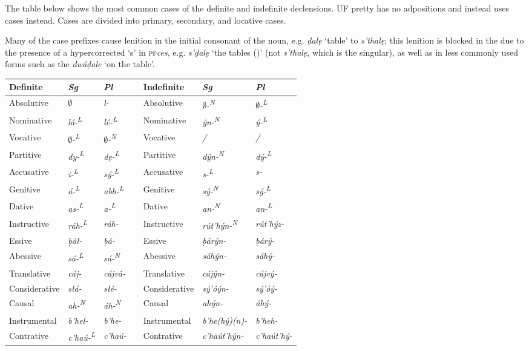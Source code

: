\documentclass[a4paper, 12pt, twoside, openright, final]{book}
\def\pfabbr{{\normalfont\scshape pf\space}}
\def\pf#1{\pfabbr\textit{#1}}
\let \nf \normalfont
\def \L {\textsuperscript{L}}
\def \N {\textsuperscript{N}}
\let \w \textit
\begin{document}
The table below shows the most common cases of the definite and indefinite declensions. UF pretty has no
adpositions and instead uses cases instead. Cases are divided into primary, secondary, and locative cases.

Many of the case prefixes cause lenition in the initial consonant of the noun, e.g. \w{ḍalẹ} ‘table’ to
 \w{s’thalẹ}; this lenition is blocked in the  due to the presence of a hypercorrected ‘s’
in \pf{ces}, e.g. \w{s’ḍalẹ} ‘the tables ()’ (not \w{s’thalẹ}, which is the singular), as well as in
less commonly used forms such as the  \w{dwáḍalẹ} ‘on the table’.

\noindent\begin{longtable}{l|>{\it}l|>{\it}lll|>{\it}l|>{\it}l}
Definite    &\nf Sg&\nf Pl && Indefinite       &\nf Sg&\nf Pl\\\cline{1-3}\cline{5-7}
\endhead
Absolutive    & $\emptyset$            & l-       && Absolutive    & $\emptyset$-\N       & $\emptyset$-\L  \\
Nominative    & lá-\L          & lé-\L    && Nominative    & ŷn-\N        & ý-\L    \\
Vocative      & $\emptyset$-\L         & $\emptyset$-\N   && Vocative      & /            & /       \\
Partitive     & dy-\L          & dẹ-\L    && Partitive     & dŷn-\N       & dý-\L   \\
Accusative    & i-\L           & sý-\L    && Accusative    & s-\L         & s-      \\
Genitive      & á-\L           & abh-\L   && Genitive      & sý-\N        & sý-\L   \\
Dative        & as-\L          & a-\L     && Dative        & an-\N        & an-\L   \\
Instructive   & ráh-\L         & ráh-     && Instructive   & rút’hýn-\N   & rút’hýz- \\\cline{1-3}\cline{5-7}

Essive        & ḅáł-           & ḅá-      && Essive        & ḅárýn-       & ḅárý-    \\
Abessive      & sá-\L          & sá-\N    && Abessive      & sáhýn-       & sáhý-    \\
Translative   & cáj-           & cájvâ-   && Translative   & cájŷn-       & cájvý-   \\ %
Considerative & słá-           & słé-     && Considerative & sý’óýn-      & sý’óý-   \\
Causal        & ah-\N          & áh-\N    && Causal        & ahýn-        & áhý-     \\ %
Instrumental  & b’hel-         & b’he-    && Instrumental  & b’he(hý)(n)- & b’heh-   \\
Contrative    & c’haú-\L       & c’haú-   && Contrative    & c’haút’hýn-  & c’haút’hý- \\\cline{1-3}\cline{5-7} %


\end{longtable}
\end{document}

